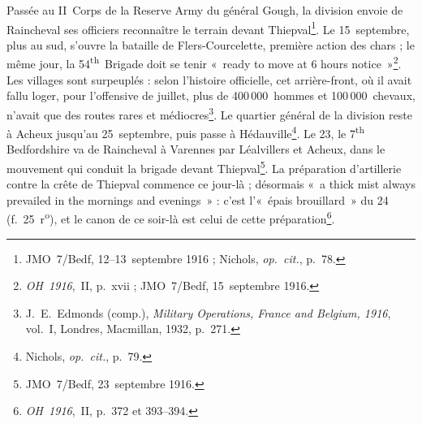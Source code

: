 Passée au II~Corps de la Reserve Army du général Gough, la division envoie de Raincheval ses officiers reconnaître le terrain devant Thiepval\footnote{JMO~7/Bedf, 12--13~septembre 1916 ; Nichols, \textit{op.~cit.}, p.~78.}. Le 15~septembre, plus au sud, s'ouvre la bataille de Flers-Courcelette, première action des chars ; le même jour, la 54\textsuperscript{th}~Brigade doit se tenir «~ready to move at 6 hours notice~»\footnote{\textit{OH~1916},~II, p.~xvii ; JMO~7/Bedf, 15~septembre 1916.}. Les villages sont surpeuplés : selon l'histoire officielle, cet arrière-front, où il avait fallu loger, pour l'offensive de juillet, plus de 400\,000~hommes et 100\,000~chevaux, n'avait que des routes rares et médiocres\footnote{J.~E.~Edmonds (comp.), \textit{Military Operations, France and Belgium, 1916}, vol.~I, Londres, Macmillan, 1932, p.~271.}. Le quartier général de la division reste à Acheux jusqu'au 25~septembre, puis passe à Hédauville\footnote{Nichols, \textit{op.~cit.}, p.~79.}. Le 23, le 7\textsuperscript{th} Bedfordshire va de Raincheval à Varennes par Léalvillers et Acheux, dans le mouvement qui conduit la brigade devant Thiepval\footnote{JMO~7/Bedf, 23~septembre 1916.}. La préparation d'artillerie contre la crête de Thiepval commence ce jour-là ; désormais «~a thick mist always prevailed in the mornings and evenings~» : c'est l'«~épais brouillard~» du 24 (f.~25~r\textsuperscript{o}), et le canon de ce soir-là est celui de cette préparation\footnote{\textit{OH~1916},~II, p.~372 et 393--394.}.

